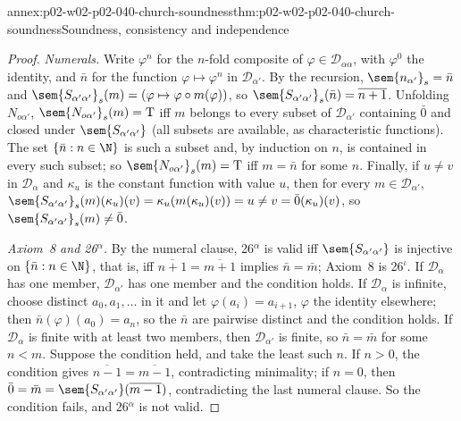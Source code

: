 \begin{annexitem}{annex:p02-w02-p02-040-church-soundness}{thm:p02-w02-p02-040-church-soundness}{Soundness, consistency and independence}
\begin{proof}
\emph{Numerals.}  Write \(\varphi^n\) for the \(n\)-fold composite of
\(\varphi\in\mathcal D_{\alpha\alpha}\), with \(\varphi^0\) the identity, and
\(\bar n\) for the function \(\varphi\mapsto\varphi^n\) in
\(\mathcal D_{\alpha'}\).  By the recursion,
\(\sem{n_{\alpha'}}_s=\bar n\) and
\(\sem{S_{\alpha'\alpha'}}_s(m)=(\varphi\mapsto\varphi\circ m(\varphi))\), so
\(\sem{S_{\alpha'\alpha'}}_s(\bar n)=\overline{n+1}\).  Unfolding
\(N_{o\alpha'}\), \(\sem{N_{o\alpha'}}_s(m)=\mathrm T\) iff \(m\) belongs to every
subset of \(\mathcal D_{\alpha'}\) containing \(\bar0\) and closed under
\(\sem{S_{\alpha'\alpha'}}\) (all subsets are available, as characteristic
functions).  The set \(\{\bar n:n\in\N\}\) is such a subset and, by
induction on \(n\), is contained in every such subset; so
\(\sem{N_{o\alpha'}}_s(m)=\mathrm T\) iff \(m=\bar n\) for some \(n\).
Finally, if \(u\neq v\) in \(\mathcal D_\alpha\) and \(\kappa_u\) is the
constant function with value \(u\), then for every \(m\in\mathcal D_{\alpha'}\),
\(\sem{S_{\alpha'\alpha'}}_s(m)(\kappa_u)(v)=\kappa_u(m(\kappa_u)(v))=u\neq v=\bar0(\kappa_u)(v)\),
so \(\sem{S_{\alpha'\alpha'}}_s(m)\neq\bar0\).

\emph{Axiom~8 and 26\(^\alpha\).}  By the numeral clause, 26\(^\alpha\) is valid
iff \(\sem{S_{\alpha'\alpha'}}\) is injective on \(\{\bar n:n\in\N\}\), that
is, iff \(\overline{n+1}=\overline{m+1}\) implies \(\bar n=\bar m\); Axiom~8 is
26\(^\iota\).  If \(\mathcal D_\alpha\) has one member, \(\mathcal D_{\alpha'}\)
has one member and the condition holds.  If \(\mathcal D_\alpha\) is infinite,
choose distinct \(a_0,a_1,\ldots\) in it and let \(\varphi(a_i)=a_{i+1}\),
\(\varphi\) the identity elsewhere; then \(\bar n(\varphi)(a_0)=a_n\), so the
\(\bar n\) are pairwise distinct and the condition holds.  If
\(\mathcal D_\alpha\) is finite with at least two members, then
\(\mathcal D_{\alpha'}\) is finite, so \(\bar n=\bar m\) for some \(n<m\).
Suppose the condition held, and take the least such \(n\).  If \(n>0\), the
condition gives \(\overline{n-1}=\overline{m-1}\), contradicting minimality;
if \(n=0\), then \(\bar0=\bar m=\sem{S_{\alpha'\alpha'}}(\overline{m-1})\),
contradicting the last numeral clause.  So the condition fails, and
26\(^\alpha\) is not valid.


\end{proof}
\end{annexitem}
